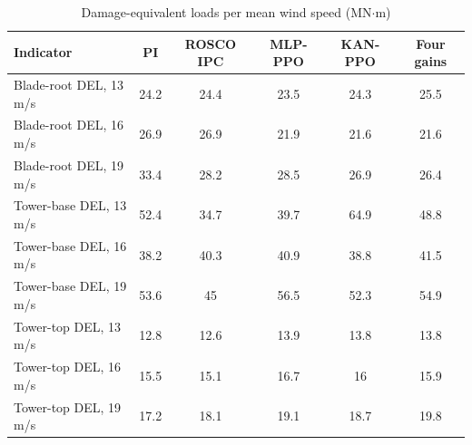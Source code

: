\begin{table}[!t]
\centering
\caption{Damage-equivalent loads per mean wind speed (MN$\cdot$m)}
\label{tab:bywind}
\renewcommand{\arraystretch}{1.15}
\begin{tabular}{lccccc}
\hline\hline
Indicator & PI & ROSCO IPC & MLP-PPO & KAN-PPO & Four gains \\
\hline
Blade-root DEL, 13 m/s & 24.2 & 24.4 & 23.5 & 24.3 & 25.5 \\
Blade-root DEL, 16 m/s & 26.9 & 26.9 & 21.9 & 21.6 & 21.6 \\
Blade-root DEL, 19 m/s & 33.4 & 28.2 & 28.5 & 26.9 & 26.4 \\
Tower-base DEL, 13 m/s & 52.4 & 34.7 & 39.7 & 64.9 & 48.8 \\
Tower-base DEL, 16 m/s & 38.2 & 40.3 & 40.9 & 38.8 & 41.5 \\
Tower-base DEL, 19 m/s & 53.6 & 45 & 56.5 & 52.3 & 54.9 \\
Tower-top DEL, 13 m/s & 12.8 & 12.6 & 13.9 & 13.8 & 13.8 \\
Tower-top DEL, 16 m/s & 15.5 & 15.1 & 16.7 & 16 & 15.9 \\
Tower-top DEL, 19 m/s & 17.2 & 18.1 & 19.1 & 18.7 & 19.8 \\
\hline\hline
\end{tabular}
\end{table}

